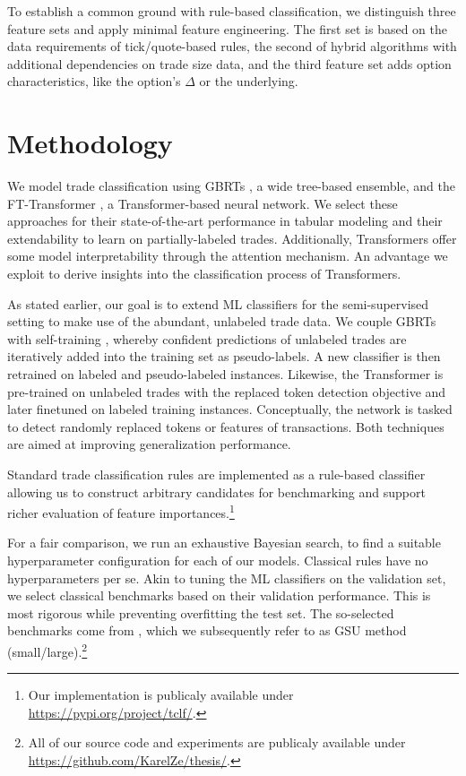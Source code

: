 To establish a common ground with rule-based classification, we distinguish three feature sets and apply minimal feature engineering. The first set is based on the data requirements of tick/quote-based rules, the second of hybrid algorithms with additional dependencies on trade size data, and the third feature set adds option characteristics, like the option's $\Delta$ or the underlying. 

\section{Methodology}

We model trade classification using \glspl{GBRT} \autocites[][]{friedmanGreedyFunctionApproximation2001}, a wide tree-based ensemble, and the FT-Transformer \autocite{gorishniyRevisitingDeepLearning2021}, a Transformer-based neural network. We select these approaches for their state-of-the-art performance in tabular modeling \autocites[][]{gorishniyRevisitingDeepLearning2021}[][]{grinsztajnWhyTreebasedModels2022} and their extendability to learn on partially-labeled trades. Additionally, Transformers offer some model interpretability through the attention mechanism. An advantage we exploit to derive insights into the classification process of Transformers.

As stated earlier, our goal is to extend \gls{ML} classifiers for the semi-supervised setting to make use of the abundant, unlabeled trade data. We couple \glspl{GBRT} with self-training \autocite{yarowskyUnsupervisedWordSense1995}, whereby confident predictions of unlabeled trades are iteratively added into the training set as pseudo-labels. A new classifier is then retrained on labeled and pseudo-labeled instances. Likewise, the Transformer is pre-trained on unlabeled trades with the replaced token detection objective \autocite{clarkElectraPretrainingText2020} and later finetuned on labeled training instances. Conceptually, the network is tasked to detect randomly replaced tokens or features of transactions. Both techniques are aimed at improving generalization performance.

Standard trade classification rules are implemented as a rule-based classifier allowing us to construct arbitrary candidates for benchmarking and support richer evaluation of feature importances.\footnote{Our implementation is publicaly available under \url{https://pypi.org/project/tclf/}.}

For a fair comparison, we run an exhaustive Bayesian search, to find a suitable hyperparameter configuration for each of our models. Classical rules have no hyperparameters per se. Akin to tuning the \gls{ML} classifiers on the validation set, we select classical benchmarks based on their validation performance. This is most rigorous while preventing overfitting the test set. The so-selected benchmarks come from \textcite{grauerOptionTradeClassification2022}, which we subsequently refer to as \gls{GSU} method (small/large).\footnote{All of our source code and experiments are publicaly available under \url{https://github.com/KarelZe/thesis/}.}


